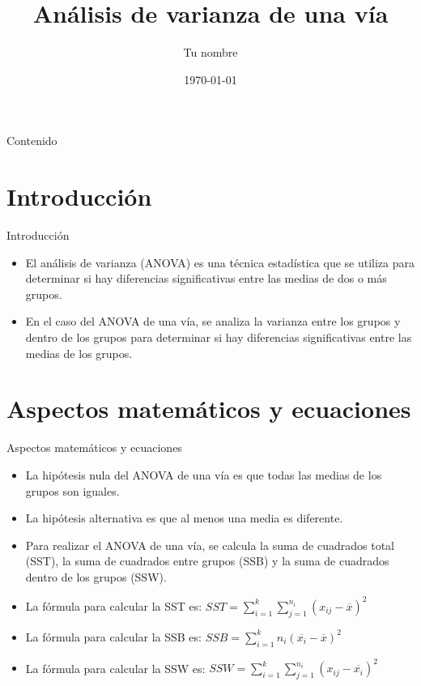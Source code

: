 \documentclass{beamer}
\title{Análisis de varianza de una vía}
\author{Tu nombre}
\date{\today}
\begin{document}
\begin{frame}
\titlepage
\end{frame}

\begin{frame}{Contenido}
    \tableofcontents
\end{frame}

\section{Introducción}
\begin{frame}{Introducción}
    \begin{itemize}
        \item El análisis de varianza (ANOVA) es una técnica estadística que se utiliza para determinar si hay diferencias significativas entre las medias de dos o más grupos.
        \item En el caso del ANOVA de una vía, se analiza la varianza entre los grupos y dentro de los grupos para determinar si hay diferencias significativas entre las medias de los grupos.
    \end{itemize}
\end{frame}

\section{Aspectos matemáticos y ecuaciones}
\begin{frame}{Aspectos matemáticos y ecuaciones}
    \begin{itemize}
        \item La hipótesis nula del ANOVA de una vía es que todas las medias de los grupos son iguales.
        \item La hipótesis alternativa es que al menos una media es diferente.
        \item Para realizar el ANOVA de una vía, se calcula la suma de cuadrados total (SST), la suma de cuadrados entre grupos (SSB) y la suma de cuadrados dentro de los grupos (SSW).
        \item La fórmula para calcular la SST es: $SST = \sum_{i=1}^{k}\sum_{j=1}^{n_i}(x_{ij}-\overline{x})^2$
        \item La fórmula para calcular la SSB es: $SSB = \sum_{i=1}^{k}n_i(\overline{x_i}-\overline{x})^2$
        \item La fórmula para calcular la SSW es: $SSW = \sum_{i=1}^{k}\sum_{j=1}^{n_i}(x_{ij}-\overline{x_i})^2$
    \end{itemize}
\end{frame}
\end{document}
